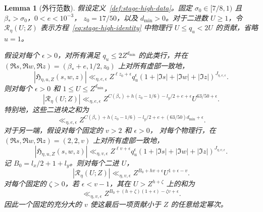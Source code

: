 \documentclass[11pt,a4paper]{article}
\numberwithin{equation}{section}
\numberwithin{figure}{section}
\newtheorem{lemma}[theorem]{Lemma}
\theoremstyle{definition}
\theoremstyle{remark}
\begin{document}
\begin{lemma}[外行范数]
\label{lem:outer-row-tails}
假设定义~\ref{def:stage-high-data}。固定
$\sigma_0\in[7/8,1)$ 且 $\beta_*>\sigma_0$，$0<e<10^{-3}$，
$z_0=17/50$，以及 $d_{\min}>0$。对于二进数 $U\ge1$，令
$\mathscr R_\eta(U;Z)$ 表示方程~\eqref{eq:stage-high-identity} 中物理行
$U\le q_u<2U$ 的贡献，省略 $u=1$。

假设对每个 $\epsilon>0$，对所有满足
$q_u\le2Z^{d_{\min}}$ 的此类行，并在
$(\Re s,\Re w,\Re z)=(\beta_*+e,1/2,z_0)$ 上对所有虚部一致地，
\begin{equation}
 |\mathfrak H_{\eta,u,Z}(s,w,z)|
 \ll_{\eta,e,\epsilon}
 Z^{\ell z_0+\epsilon}q_u^\epsilon
 (1+|\Im s|+|\Im w|+|\Im z|)^{J_{\eta,e,\epsilon}}.
 \label{eq:small-correction-bound}
\end{equation}
则对每个 $\epsilon>0$ 和 $1\le U\le Z^{d_{\min}}$，
\begin{equation}
 |\mathscr R_\eta(U;Z)|
 \ll_{\eta,e,\epsilon}
 Z^{C(\beta_*)+h(z_0-1/6)-l_y/2+e+\epsilon}
       U^{63/50+\epsilon}.
 \label{eq:small-row-bound}
\end{equation}
特别地，这些二进块之和为
\begin{equation}
 \ll_{\eta,e,\epsilon}
 Z^{C(\beta_*)+h(z_0-1/6)-l_y/2+e+(63/50)d_{\min}+\epsilon}.
 \label{eq:small-row-sum}
\end{equation}对于另一端，假设对每个固定的 $v>2$ 和 $\epsilon>0$，
对每个物理行，在
$(\Re s,\Re w,\Re z)=(2,2,v)$ 上对所有虚部一致地，
\begin{equation}
 |\mathfrak H_{\eta,u,Z}(s,w,z)|
 \ll_{\eta,v,\epsilon}
 Z^{\ell v+\epsilon}q_u^\epsilon
 (1+|\Im s|+|\Im w|+|\Im z|)^{J_{\eta,v,\epsilon}}.
 \label{eq:large-correction-bound}
\end{equation}
记 $B_0=l_x/2+1+l_y$。则对每个二进 $U$，
\begin{equation}
 |\mathscr R_\eta(U;Z)|
 \ll_{\eta,v,\epsilon}Z^{B_0+hv+\epsilon}U^{1+\epsilon-v}.
 \label{eq:large-row-bound}
\end{equation}
对每个固定的 $\zeta>0$，若 $\epsilon<v-1$，其在
$U>Z^{h+\zeta}$ 上的和为
\begin{equation}
 \ll_{\eta,v,\epsilon}
 Z^{B_0+(h+\zeta)(1+\epsilon)-\zeta v+\epsilon}.
 \label{eq:large-row-sum}
\end{equation}
因此一个固定的充分大的 $v$ 使这最后一项贡献小于 $Z$ 的任意给定幂次。
\end{lemma}
\end{document}
